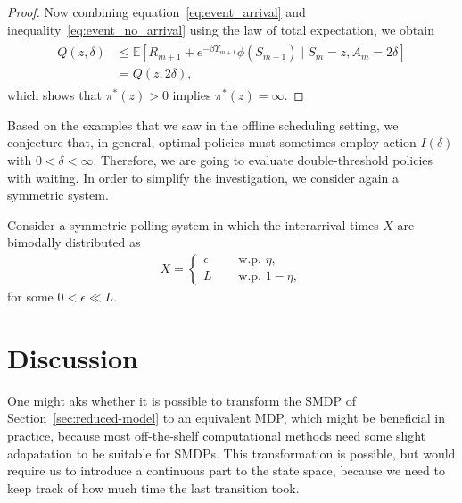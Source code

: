 \documentclass{article}
\theoremstyle{definition}
\theoremstyle{plain}
\begin{document}
\begin{proof}
  Now combining equation~\eqref{eq:event_arrival} and
  inequality~\eqref{eq:event_no_arrival} using the law of total expectation, we
  obtain
  \begin{align}
    \begin{split}
    Q(z, \delta)
    &\leq \mathbb{E}\left[ R_{m+1} + e^{-\beta \Upsilon_{m+1}} \phi(S_{m+1}) \; | \; S_{m} = z, A_{m} = 2 \delta \right] \\
     &= Q(z, 2 \delta) ,
    \end{split}
  \end{align}
  which shows that $\pi^{*}(z) > 0$ implies $\pi^{*}(z) = \infty$.
\end{proof}

Based on the examples that we saw in the offline scheduling setting, we
conjecture that, in general, optimal policies must sometimes employ action
$I(\delta)$ with $0 < \delta < \infty$. Therefore, we are going to evaluate
double-threshold policies with waiting. In order to simplify the investigation,
we consider again a symmetric system.
\begin{eg}
  Consider a symmetric polling system in which the interarrival times $X$ are
  bimodally distributed as
  \begin{align}
    X = \begin{cases}
          \epsilon \quad & \text{ w.p. } \eta , \\
          L \quad & \text{ w.p. } 1 - \eta,
        \end{cases}
  \end{align}
  for some $0 < \epsilon \ll L$.
\end{eg}


\section{Discussion}

One might aks whether it is possible to transform the SMDP of
Section~\ref{sec:reduced-model} to an equivalent MDP, which might be beneficial
in practice, because most off-the-shelf computational methods need some slight
adapatation to be suitable for SMDPs. This transformation is possible, but would
require us to introduce a continuous part to the state space, because we need to
keep track of how much time the last transition took.
\end{document}
